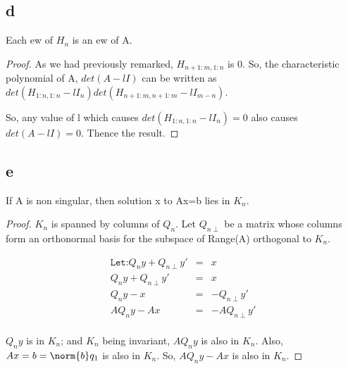 \documentclass[10pt]{amsart}
\begin{document}
\subsection{d}
\begin{thm}
 Each ew of $H_{n}$ is an ew of A.
\end{thm}
\begin{proof}
As we had previously remarked, $H_{n+1:m,1:n}$ is 0. So, the characteristic polynomial of A, $det(A-lI)$ can be written as $det(H_{1:n,1:n} - lI_{n})det(H_{n+1:m,n+1:m} - lI_{m-n})$.

So, any value of l which causes $det(H_{1:n,1:n} - lI_{n}) = 0$ also causes $det(A-lI)=0$. Thence the result.
\end{proof}

\subsection{e}
\begin{thm}
 If A is non singular, then solution x to Ax=b lies in $K_{n}$.
\end{thm}
\begin{proof}
$K_{n}$ is spanned by columns of $Q_{n}$. Let $Q_{n \perp}$ be a matrix whose columns form an orthonormal basis for the subspace of Range(A) orthogonal to $K_{n}$.

\begin{eqnarray*}
\texttt{Let:} Q_{n}y + Q_{n \perp}y' &=& x\\
Q_{n}y + Q_{n \perp}y' &=& x\\
Q_{n}y - x  &=& -Q_{n \perp}y'\\
AQ_{n}y - Ax  &=& -AQ_{n \perp}y'\\
\end{eqnarray*}

$Q_{n}y$ is in $K_{n}$; and $K_{n}$ being invariant, $AQ_{n}y$ is also in $K_{n}$. Also, $Ax = b = \norm{b}q_{1}$ is also in $K_{n}$. So, $AQ_{n}y - Ax$ is also in $K_{n}$. 

\tbc

\end{proof}
\end{document}
